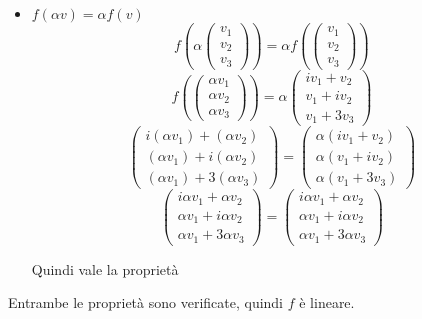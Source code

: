 \documentclass[a4paper]{article}
\theoremstyle{break}
\theoremstyle{break}
\theoremstyle{break}
\theoremstyle{break}
\begin{document}
\begin{enumerate}
\begin{itemize}
		      \item
		            \(
		            f(\alpha v) = \alpha f(v)
		            \)
		            \[
			            f \left( \alpha \begin{pmatrix} v_1\\v_2\\v_3 \end{pmatrix}  \right)
			            =
			            \alpha f \left( \begin{pmatrix} v_1\\v_2\\v_3 \end{pmatrix}  \right)
		            \]
		            \[
			            f \left( \begin{pmatrix} \alpha v_1\\\alpha v_2\\\alpha v_3 \end{pmatrix}  \right)
			            =
			            \alpha \begin{pmatrix}
				            iv_1 + v_2 \\
				            v_1 + iv_2 \\
				            v_1 + 3v_3
			            \end{pmatrix}
		            \]
		            \[
			            \begin{pmatrix}
				            i(\alpha v_1) + (\alpha v_2) \\
				            (\alpha v_1) + i(\alpha v_2) \\
				            (\alpha v_1) + 3(\alpha v_3)
			            \end{pmatrix}
			            =
			            \begin{pmatrix}
				            \alpha (iv_1 + v_2) \\
				            \alpha (v_1 + iv_2) \\
				            \alpha (v_1 + 3v_3)
			            \end{pmatrix}
		            \]
		            \[
			            \begin{pmatrix}
				            i\alpha v_1 + \alpha v_2 \\
				            \alpha v_1 + i\alpha v_2 \\
				            \alpha v_1 + 3\alpha v_3
			            \end{pmatrix}
			            =
			            \begin{pmatrix}
				            i\alpha v_1 + \alpha v_2  \\
				            \alpha v_1 + i \alpha v_2 \\
				            \alpha v_1 + 3 \alpha v_3
			            \end{pmatrix}
		            \]
		            \begin{center}
			            Quindi vale la proprietà
		            \end{center}
	      \end{itemize}
	      Entrambe le proprietà sono verificate, quindi \( f \) è lineare.



\end{enumerate}
\end{document}
